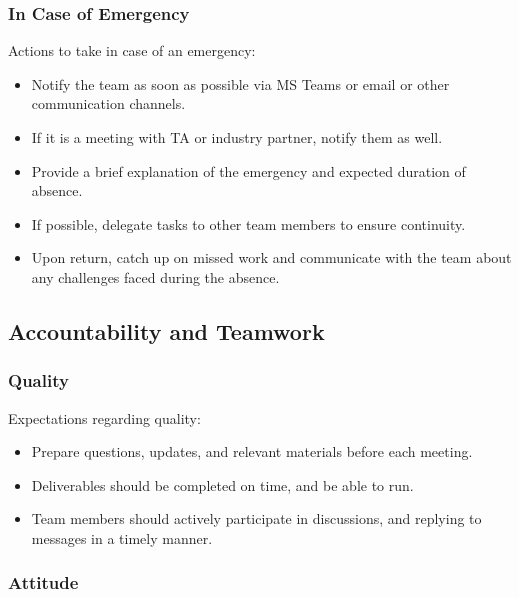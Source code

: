 \documentclass{article}
\begin{document}
\begin{enumerate}
\begin{itemize}
\subsubsection*{In Case of Emergency}

Actions to take in case of an emergency:
\begin{itemize}
  \item Notify the team as soon as possible via MS Teams or email or other communication channels.
  \item If it is a meeting with TA or industry partner, notify them as well.
  \item Provide a brief explanation of the emergency and expected duration of absence.
  \item If possible, delegate tasks to other team members to ensure continuity.
  \item Upon return, catch up on missed work and communicate with the team about any challenges faced during the absence.
\end{itemize}

\subsection*{Accountability and Teamwork}

\subsubsection*{Quality} 

Expectations regarding quality:
\begin{itemize}
  \item Prepare questions, updates, and relevant materials before each meeting.
  \item Deliverables should be completed on time, and be able to run.
  \item Team members should actively participate in discussions, and replying to messages in a timely manner.
\end{itemize}

\subsubsection*{Attitude}


\end{itemize}
\end{enumerate}
\end{document}
